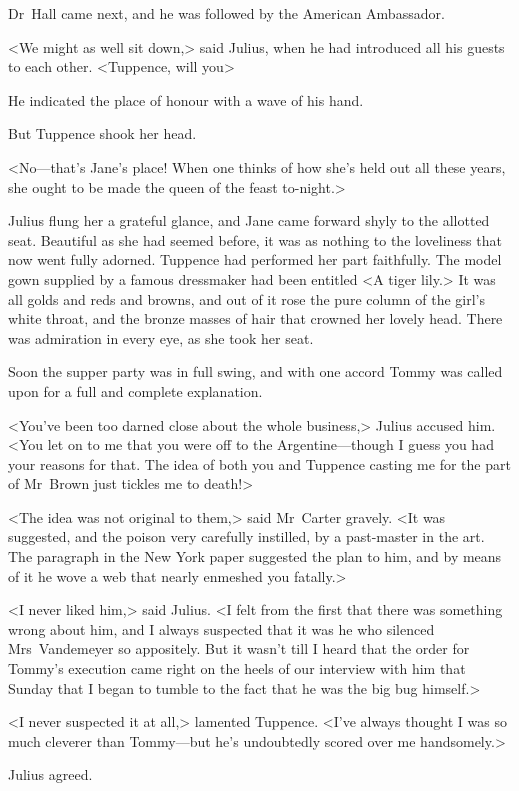 Dr~Hall came next, and he was followed by the American Ambassador.

<We might as well sit down,> said Julius, when he had introduced all his guests to each other. <Tuppence, will you\longdash>

He indicated the place of honour with a wave of his hand.

But Tuppence shook her head.

<No—that's Jane's place! When one thinks of how she's held out all these years, she ought to be made the queen of the feast to-night.>

Julius flung her a grateful glance, and Jane came forward shyly to the allotted seat. Beautiful as she had seemed before, it was as nothing to the loveliness that now went fully adorned. Tuppence had performed her part faithfully. The model gown supplied by a famous dressmaker had been entitled <A tiger lily.> It was all golds and reds and browns, and out of it rose the pure column of the girl's white throat, and the bronze masses of hair that crowned her lovely head. There was admiration in every eye, as she took her seat.

Soon the supper party was in full swing, and with one accord Tommy was called upon for a full and complete explanation.

<You've been too darned close about the whole business,> Julius accused him. <You let on to me that you were off to the Argentine—though I guess you had your reasons for that. The idea of both you and Tuppence casting me for the part of Mr~Brown just tickles me to death!>

<The idea was not original to them,> said Mr~Carter gravely. <It was suggested, and the poison very carefully instilled, by a past-master in the art. The paragraph in the New York paper suggested the plan to him, and by means of it he wove a web that nearly enmeshed you fatally.>

<I never liked him,> said Julius. <I felt from the first that there was something wrong about him, and I always suspected that it was he who silenced Mrs~Vandemeyer so appositely. But it wasn't till I heard that the order for Tommy's execution came right on the heels of our interview with him that Sunday that I began to tumble to the fact that he was the big bug himself.>

<I never suspected it at all,> lamented Tuppence. <I've always thought I was so much cleverer than Tommy—but he's undoubtedly scored over me handsomely.>

Julius agreed.

